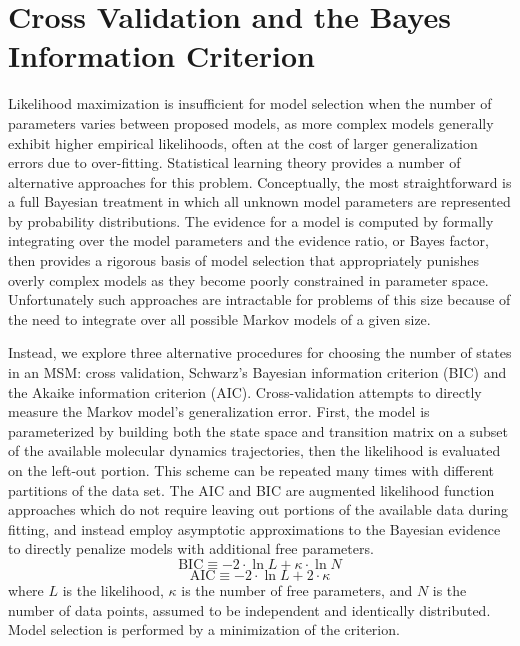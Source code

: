 \documentclass[journal=jpcbfk, layout=twocolumn, manuscript=article]{achemso}
\begin{document}
\section{Cross Validation and the Bayes Information Criterion}
Likelihood maximization is insufficient for model selection when the number of parameters varies between proposed models, as more complex models generally exhibit higher empirical likelihoods, often at the cost of larger generalization errors due to over-fitting\cite{Liddle2007Information, Hastie01Elements}. Statistical learning theory provides a number of alternative approaches for this problem. Conceptually, the most straightforward is a full Bayesian treatment in which all unknown model parameters are represented by probability distributions. The evidence for a model is computed by formally integrating over the model parameters and the evidence ratio, or Bayes factor\cite{Gelfand94Bayesian}, then provides a rigorous basis of model selection that appropriately punishes overly complex models as they become poorly constrained in parameter space. Unfortunately such approaches are intractable for problems of this size because of the need to integrate over all possible Markov models of a given size.

Instead, we explore three alternative procedures for choosing the number of states in an MSM: cross validation, Schwarz's Bayesian information criterion (BIC)\cite{Schwartz78Estimating} and the Akaike information criterion (AIC)\cite{Akaike1974AIC}. Cross-validation attempts to directly measure the Markov model's generalization error. First, the model is parameterized by building both the state space and transition matrix on a subset of the available molecular dynamics trajectories, then the likelihood is evaluated on the left-out portion. This scheme can be repeated many times with different partitions of the data set. The AIC and BIC are augmented likelihood function approaches which do not require leaving out portions of the available data during fitting, and instead employ asymptotic approximations to the Bayesian evidence to directly penalize models with additional free parameters.
\begin{equation}
\label{eq:bic}
\mathrm{BIC} \equiv -2\cdot \ln L + \kappa \cdot \ln N
\end{equation}
\begin{equation}
\label{eq:aic}
\mathrm{AIC} \equiv -2\cdot \ln L + 2 \cdot \kappa
\end{equation} where $L$ is the likelihood, $\kappa$ is the number of free parameters, and $N$ is the number of data points, assumed to be independent and identically distributed. Model selection is performed by a minimization of the criterion.
\end{document}
